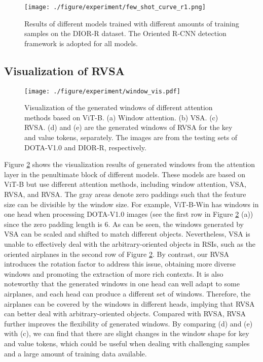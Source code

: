 \documentclass[10pt, journal,twoside]{IEEEtran}
\begin{document}
\begin{figure}[t]
  \centering
  \texttt{[image: ./figure/experiment/few\_shot\_curve\_r1.png]}\\
  \caption{Results of different models trained with different amounts of training samples on the DIOR-R dataset. The Oriented R-CNN detection framework is adopted for all models.
  }
  \label{few_shot}
\end{figure}

\subsection{Visualization of RVSA}

\begin{figure}[t]
  \centering
  \texttt{[image: ./figure/experiment/window\_vis.pdf]}\\
  \caption{Visualization of the generated windows of different attention methods based on ViT-B. (a) Window attention. (b) VSA. (c) RVSA. (d) and (e) are the generated windows of RVSA for the key and value tokens, separately. The images are from the testing sets of DOTA-V1.0 and DIOR-R, respectively.
  }
  \label{window_vis}
\end{figure}

Figure \ref{window_vis} shows the visualization results of generated windows from the attention layer in the penultimate block of different models. These models are based on ViT-B but use different attention methods, including window attention, VSA, RVSA, and RVSA. The gray areas denote zero paddings such that the feature size can be divisible by the window size. For example, ViT-B-Win has  windows in one head when processing DOTA-V1.0 images (see the first row in Figure \ref{window_vis} (a)) since the zero padding length is 6. As can be seen, the windows generated by VSA can be scaled and shifted to match different objects. Nevertheless, VSA is unable to effectively deal with the arbitrary-oriented objects in RSIs, such as the oriented airplanes in the second row of Figure \ref{window_vis}. By contrast, our RVSA introduces the rotation factor to address this issue, obtaining more diverse windows and promoting the extraction of more rich contexts. It is also noteworthy that the generated windows in one head can well adapt to some airplanes, and each head can produce a different set of windows. Therefore, the airplanes can be covered by the windows in different heads, implying that RVSA can better deal with arbitrary-oriented objects. Compared with RVSA, RVSA further improves the flexibility of generated windows. By comparing (d) and (e) with (c), we can find that there are slight changes in the window shape for key and value tokens, which could be useful when dealing with challenging samples and a large amount of training data available.
\end{document}
